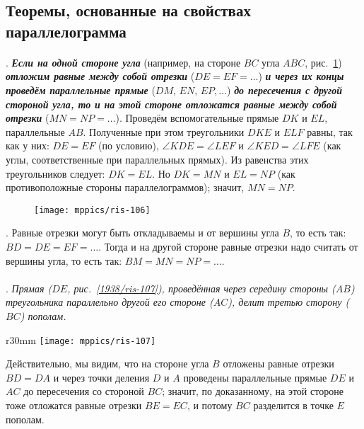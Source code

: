 \subsection*{Теоремы, основанные на свойствах параллелограмма}

\paragraph{}\label{1938/95}
.
\textbf{\emph{Если на одной стороне угла}} (например, на стороне $BC$ угла $ABC$, рис.~\ref{1938/ris-106}) \textbf{\emph{отложим равные между собой отрезки}} ($DE=EF=\dots$) \textbf{\emph{и через их концы проведём параллельные прямые}} ($DM$, $EN$, $EP,\dots$) \textbf{\emph{до пересечения с другой стороной угла, то и на этой стороне отложатся равные между собой отрезки}} ($MN=NP=\dots$).
Проведём вспомогательные прямые $DK$ и $EL$, параллельные $AB$.
Полученные при этом треугольники $DKE$ и $ELF$ равны, так как у них:
$DE=EF$ (по условию), $\angle KDE=\angle LEF$ и $\angle KED = \angle LFE$ (как углы, соответственные при параллельных прямых).
Из равенства этих треугольников следует:
$DK=EL$.
Но $DK=MN$ и $EL=NP$ (как противоположные стороны параллелограммов);
значит, $MN=NP$.

\begin{figure}[h!]
\centering
\texttt{[image: mppics/ris-106]}
\caption{}\label{1938/ris-106}
\end{figure}

\smallskip
\mbox{.}
Равные отрезки могут быть откладываемы и от вершины угла $B$, то есть
так:
$BD=DE= EF=\dots$.
Тогда и на другой стороне равные отрезки надо считать от вершины угла, то есть так:
$BM=MN=NP=\dots$.

\paragraph{}\label{1938/96}
\mbox{.}
\emph{Прямая \emph{($DE$, рис.~\ref{1938/ris-107}),} проведённая через середину стороны ($AB$) треугольника параллельно другой его стороне ($AC$), делит третью сторону ($BC$) пополам.}

\begin{wrapfigure}[8]{r}{30mm}
\vskip-3mm
\centering
\texttt{[image: mppics/ris-107]}
\caption{}\label{1938/ris-107}
\end{wrapfigure}


Действительно, мы видим, что на стороне угла $B$ отложены равные отрезки $BD=DA$ и через точки деления $D$ и $A$ проведены параллельные прямые $DE$ и $AC$ до пересечения со стороной $BC$;
значит, по доказанному, на этой стороне тоже отложатся равные отрезки $BE=EC$, и потому $BC$ разделится в точке $E$ пополам.

